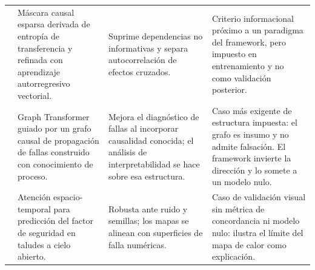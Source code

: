 {\begin{longtable}{P{0.19}P{0.25}P{0.28}P{0.28}}
\cite{zhou2026causal} & Máscara causal esparsa derivada de entropía de transferencia y refinada con aprendizaje autorregresivo vectorial. & Suprime dependencias no informativas y separa autocorrelación de efectos cruzados. & Criterio informacional próximo a un paradigma del framework, pero impuesto en entrenamiento y no como validación posterior.\\
\cite{zhao2026causalguided} & Graph Transformer guiado por un grafo causal de propagación de fallas construido con conocimiento de proceso. & Mejora el diagnóstico de fallas al incorporar causalidad conocida; el análisis de interpretabilidad se hace sobre esa estructura. & Caso más exigente de estructura impuesta: el grafo es insumo y no admite falsación. El framework invierte la dirección y lo somete a un modelo nulo.\\
\cite{khayitov2026stgeonet} & Atención espacio-temporal para predicción del factor de seguridad en taludes a cielo abierto. & Robusta ante ruido y semillas; los mapas se alinean con superficies de falla numéricas. & Caso de validación visual sin métrica de concordancia ni modelo nulo: ilustra el límite del mapa de calor como explicación.\\
\bottomrule
\end{longtable}
}
